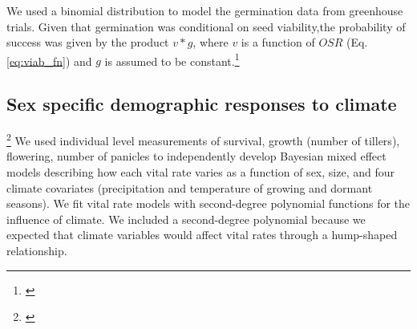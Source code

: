 \documentclass[12pt]{article}
\newcommand{\tom}[2]{{\color{red}{#1}}\footnote{\textit{\color{red}{#2}}}}
\begin{document}
We used a binomial distribution to model the germination data from greenhouse trials.
Given that germination was conditional on seed viability,the probability of success was given by the product $v*g$, where $v$ is a function of $OSR$ (Eq. \ref{eq:viab_fn}) and $g$ is assumed to be constant.\tom{}{You provide no information about how this model was fit. This echoes my previous comment that the data analysis should be better organized.}

\subsection*{Sex specific demographic responses to climate}
\tom{}{This section needs to be more carefully edited, which I have not done. There is redundancy between the two paragraphs and most importantly, there is not enough biological rationale for the model that you fit. You do not describe which interactions you include, which you do not include, and why. This is a very complex model -- 24 fixed-effect coefficients! -- and it will get skepticism from reviewers. You need to justify why this is the right model, especially since you do not have any model selection or variable selection.}
We used individual level measurements of survival, growth (number of tillers), flowering, number of panicles to independently develop Bayesian mixed effect models describing how each vital rate varies as a function of sex, size, and four climate covariates (precipitation and temperature of growing and dormant seasons). 
We fit vital rate models with second-degree polynomial functions for the influence of climate.
We included a second-degree polynomial because we expected that climate variables would affect vital rates through a hump-shaped relationship. 
\end{document}
